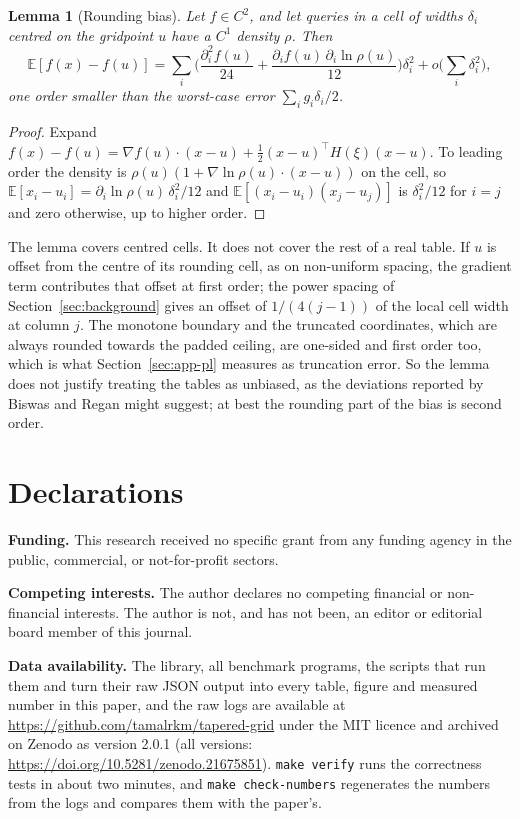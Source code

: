 \documentclass[preprint,12pt]{elsarticle}
\newtheorem{lemma}[theorem]{Lemma}
\begin{document}
\begin{lemma}[Rounding bias]\label{lem:bias}
Let $f\in C^{2}$, and let queries in a cell of widths $\delta_i$ centred on the
gridpoint $u$ have a $C^{1}$ density $\rho$. Then
\[
\mathbb E[f(x)-f(u)]=\sum_i\Big(\frac{\partial_i^2 f(u)}{24}
+\frac{\partial_i f(u)\,\partial_i\ln\rho(u)}{12}\Big)\delta_i^{2}
+o\Big(\sum_i\delta_i^2\Big),
\]
one order smaller than the worst-case error $\sum_i g_i\delta_i/2$.
\end{lemma}
\begin{proof}
Expand $f(x)-f(u)=\nabla f(u)\cdot(x-u)+\tfrac12(x-u)^{\top}H(\xi)(x-u)$. To
leading order the density is $\rho(u)(1+\nabla\ln\rho(u)\cdot(x-u))$ on the cell, so
$\mathbb E[x_i-u_i]=\partial_i\ln\rho(u)\,\delta_i^2/12$ and
$\mathbb E[(x_i-u_i)(x_j-u_j)]$ is $\delta_i^2/12$ for $i=j$ and zero otherwise, up to higher order.
\end{proof}

The lemma covers centred cells. It does not cover the rest of a real table. If $u$
is offset from the centre of its rounding cell, as on non-uniform spacing, the
gradient term contributes that offset at first order; the power spacing of
Section~\ref{sec:background} gives an offset of $1/(4(j-1))$ of the local cell
width at column $j$. The monotone boundary and the truncated coordinates, which are
always rounded towards the padded ceiling, are one-sided and first order too, which
is what Section~\ref{sec:app-pl} measures as truncation error. So the lemma does not
justify treating the tables as unbiased, as the deviations reported by Biswas and
Regan might suggest; at best the rounding part of the bias is second order.

\section*{Declarations}

\noindent\textbf{Funding.} This research received no specific grant from any
funding agency in the public, commercial, or not-for-profit sectors.

\medskip\noindent\textbf{Competing interests.} The author declares no competing
financial or non-financial interests. The author is not, and has not been, an
editor or editorial board member of this journal.

\medskip\noindent\textbf{Data availability.} The library, all benchmark programs,
the scripts that run them and turn their raw JSON output into every table, figure
and measured number in this paper, and the raw logs are available at
\url{https://github.com/tamalrkm/tapered-grid} under the MIT licence and archived
on Zenodo as version 2.0.1 (all versions:
\url{https://doi.org/10.5281/zenodo.21675851}).\cite{artifact2026}
\texttt{make verify} runs the correctness tests in about two minutes, and
\texttt{make check-numbers} regenerates the numbers from the logs and compares them
with the paper's.
\end{document}
